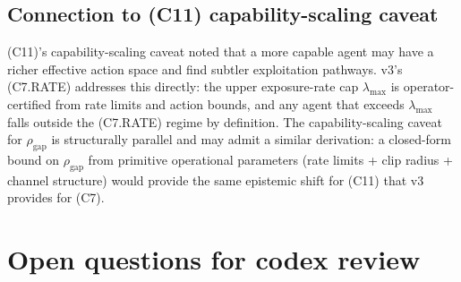 \documentclass{article}
\newcommand{\rhogap}{\rho_{\mathrm{gap}}}
\newcommand{\lammax}{\lambda_{\max}}
\begin{document}
\subsection{Connection to (C11) capability-scaling caveat}

(C11)'s capability-scaling caveat noted that a more capable agent
may have a richer effective action space and find subtler
exploitation pathways.  v3's (C7.RATE) addresses this directly:
the upper exposure-rate cap $\lammax$ is operator-certified from
rate limits and action bounds, and any agent that exceeds
$\lammax$ falls outside the (C7.RATE) regime by definition.  The
capability-scaling caveat for $\rhogap$ is structurally parallel
and may admit a similar derivation: a closed-form bound on
$\rhogap$ from primitive operational parameters (rate limits +
clip radius + channel structure) would provide the same epistemic
shift for (C11) that v3 provides for (C7).

\section{Open questions for codex review}
\end{document}

